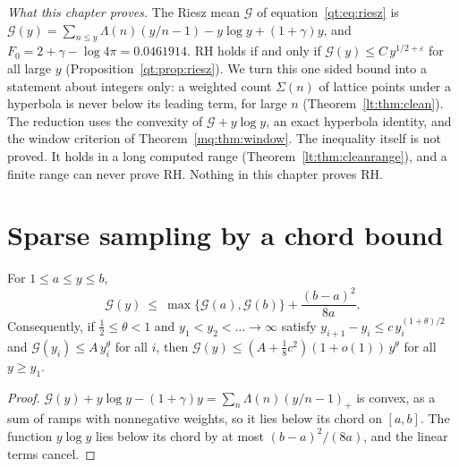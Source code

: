
\emph{What this chapter proves.} The Riesz mean $\mathcal G$ of equation~\eqref{qt:eq:riesz} is $\mathcal G(y)=\sum_{n\le y}\Lambda(n)(y/n-1)-y\log y+(1+\gamma)y$, and $F_0=2+\gamma-\log4\pi=0.0461914$. RH holds if and only if $\mathcal G(y)\le C\,y^{1/2+\varepsilon}$ for all large $y$ (Proposition~\ref{qt:prop:riesz}). We turn this one sided bound into a statement about integers only: a weighted count $\Sigma(n)$ of lattice points under a hyperbola is never below its leading term, for large $n$ (Theorem~\ref{lt:thm:clean}). The reduction uses the convexity of $\mathcal G+y\log y$, an exact hyperbola identity, and the window criterion of Theorem~\ref{mq:thm:window}. The inequality itself is not proved. It holds in a long computed range (Theorem~\ref{lt:thm:cleanrange}), and a finite range can never prove RH. Nothing in this chapter proves RH.

\section{Sparse sampling by a chord bound}\label{lt:sec:chord}

\begin{theorem}\label{lt:thm:chord}
For $1\le a\le y\le b$,
\[
\mathcal G(y)\ \le\ \max\{\mathcal G(a),\mathcal G(b)\}+\frac{(b-a)^2}{8a}.
\]
Consequently, if $\tfrac12\le\theta<1$ and $y_1<y_2<\dots\to\infty$ satisfy $y_{i+1}-y_i\le c\,y_i^{(1+\theta)/2}$ and $\mathcal G(y_i)\le A\,y_i^\theta$ for all $i$, then $\mathcal G(y)\le(A+\tfrac18c^2)(1+o(1))\,y^\theta$ for all $y\ge y_1$.
\end{theorem}

\begin{proof}
$\mathcal G(y)+y\log y-(1+\gamma)y=\sum_n\Lambda(n)(y/n-1)_+$ is convex, as a sum of ramps with nonnegative weights, so it lies below its chord on $[a,b]$. The function $y\log y$ lies below its chord by at most $(b-a)^2/(8a)$, and the linear terms cancel.
\end{proof}

